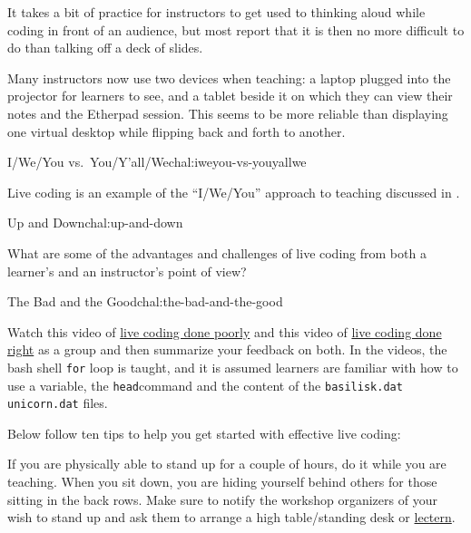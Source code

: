 It takes a bit of practice for instructors to get used to thinking aloud
while coding in front of an audience, but most report that it is then no
more difficult to do than talking off a deck of slides.

Many instructors now use two devices when teaching: a laptop plugged
into the projector for learners to see, and a tablet beside it on which
they can view their notes and the Etherpad session. This seems to be
more reliable than displaying one virtual desktop while flipping back
and forth to another.

\begin{challenge}{I/We/You vs.~You/Y'all/We}{chal:iweyou-vs-youyallwe}

Live coding is an example of the ``I/We/You'' approach to teaching
discussed in .
\end{challenge}

\begin{challenge}{Up and Down}{chal:up-and-down}

What are some of the advantages and challenges of live coding from both
a learner's and an instructor's point of view?
\end{challenge}

\begin{challenge}{The Bad and the Good}{chal:the-bad-and-the-good}

Watch this video of \href{https://youtu.be/bXxBeNkKmJE}{live coding done
poorly} and this video of \href{https://youtu.be/SkPmwe\_WjeY}{live
coding done right} as a group and then summarize your feedback on both.
In the videos, the bash shell \texttt{for} loop is taught, and it is
assumed learners are familiar with how to use a variable, the
\texttt{head}command and the content of the
\texttt{basilisk.dat unicorn.dat} files.
\end{challenge}


Below follow ten tips to help you get started with effective live
coding:


If you are physically able to stand up for a couple of hours, do it
while you are teaching. When you sit down, you are hiding yourself
behind others for those sitting in the back rows. Make sure to notify
the workshop organizers of your wish to stand up and ask them to arrange
a high table/standing desk or
\href{https://en.wikipedia.org/wiki/Lectern\#Academic\_context}{lectern}.

